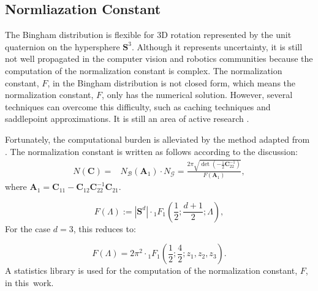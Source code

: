 \documentclass[micromachines,article,accept,pdftex,moreauthors]{Definitions/mdpi}
\begin{document}

\subsection{Normliazation Constant} \label{3.3}
The Bingham distribution is flexible for 3D rotation represented by the unit quaternion on the hypersphere $\mathbf{S}^{3}$. Although it represents {uncertainty}, %
it is still not well propagated in the computer vision and robotics communities because the computation of the normalization constant is complex. The normalization constant, $F$, in the Bingham distribution is not closed form, which means the normalization constant, $F$, only has the numerical solution. However, several techniques can overcome this difficulty, such as caching techniques \cite{gloverMonteCarloPose2011} and saddlepoint approximations. It is still an area of active research \cite{gilitschenskiDEEPORIENTATIONUNCERTAINTY2020}.

Fortunately, the computational burden is alleviated by the method adapted from \cite{gilitschenskiNewProbabilityDistribution2014}. The normalization constant is written as follows according to the discussion:
\begin{align*}
N(\boldsymbol{C}) = & {{N_{\mathcal{B}}}(\boldsymbol{A}_1)} \cdot N_{\mathcal{G}} = \frac{2 \pi \sqrt{\operatorname{det}\left(-\frac{1}{2} \boldsymbol{C}_{22}^{-1}\right)}}{F\left(\boldsymbol{A}_1\right)},
\end{align*}
where $\boldsymbol{A}_1 = \boldsymbol{C}_{11}-\boldsymbol{C}_{12} \boldsymbol{C}_{22}^{-1} \boldsymbol{C}_{21}$.

\begin{equation*}
    F(\Lambda):=\left|\mathbf{S}^{d}\right| \cdot{ }_{1} F_{1}\left(\frac{1}{2}; \frac{d+1}{2}; \Lambda \right),
\end{equation*}
{For the} %
 case $d=3$, this reduces to: 

\begin{equation*}
    F(\Lambda)=2 {\pi}^{2} \cdot{ }_{1} F_{1}\left(\frac{1}{2}; \frac{4}{2}; z_{1}, z_{2}, z_{3}\right). 
\end{equation*}
A statistics library \cite{kurzDirectionalStatisticsFiltering2017} is used for the computation of the normalization constant, $F$, in \mbox{this work}.
\end{document}
